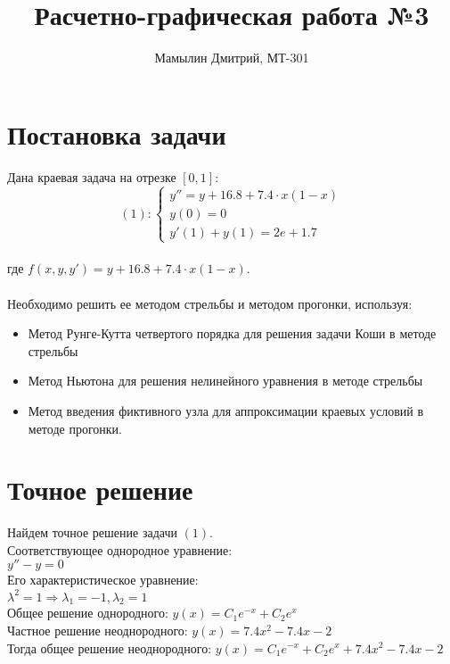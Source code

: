 \documentclass[12pt,a4paper]{article}
\title{Расчетно-графическая работа №3}
\author{Мамылин Дмитрий, МТ-301}
\begin{document}

\maketitle
\thispagestyle{empty}

\newpage
\thispagestyle{empty}

    \section*{Постановка задачи}
        Дана краевая задача на отрезке $[0, 1]$:\\
        \[
        (1):
        \begin{cases}
        	y'' = y + 16.8 + 7.4 \cdot x(1 - x)\\
	    	y(0) = 0\\
     		y'(1) + y(1) = 2e + 1.7
     	\end{cases}
     	\]\\
     	где $f(x, y, y') = y + 16.8 + 7.4 \cdot x(1 - x)$.\\\\
     	
     	\noindent
        Необходимо решить ее методом стрельбы и методом прогонки, используя:\\
        \vspace{-5mm}
        \begin{itemize}
        \setlength\itemsep{-1.5em}
	        \item Метод Рунге-Кутта четвертого порядка для решения задачи Коши в методе стрельбы\\
    	    \item Метод Ньютона для решения нелинейного уравнения в методе стрельбы\\
        	\item Метод введения фиктивного узла для аппроксимации краевых условий в методе прогонки.
        \end{itemize}
        
    \section*{Точное решение}
        Найдем точное решение задачи $(1)$.\\
        Соответствующее однородное уравнение:\\
        $y'' - y = 0$\\
        Его характеристическое уравнение:\\
        $\lambda^{2} = 1 \Rightarrow \lambda_{1} = -1, \lambda_{2} = 1$\\
        Общее решение однородного: $y(x) = C_{1}e^{-x} + C_{2}e^{x}$\\
        Частное решение неоднородного: $y(x) = 7.4x^{2} - 7.4x - 2$\\
        Тогда общее решение неоднородного: $y(x) = C_{1}e^{-x} + C_{2}e^{x} +
        7.4x^{2} - 7.4x - 2$\\\\
        
\end{document}
